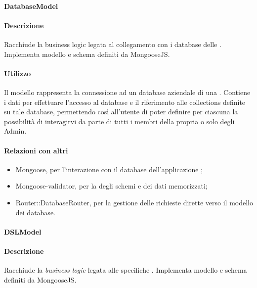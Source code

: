 \paragraph{DatabaseModel}
\paragraph*{Descrizione}

Racchiude la business logic legata al collegamento con i database delle . Implementa modello e schema definiti da MongooseJS.

\paragraph*{Utilizzo}
Il modello rappresenta la connessione ad un database aziendale di una . Contiene i dati per effettuare l'accesso al database e il riferimento alle collections definite su tale database, permettendo così all'utente di poter definire per ciascuna  la possibilità di interagirvi da parte di tutti i membri della propria  o solo degli Admin.

\paragraph*{Relazioni con altri }
\begin{itemize}
\item Mongoose, per l'interazione con il database  dell'applicazione ;
\item Mongoose-validator, per la  degli schemi e dei dati memorizzati;
\item Router::DatabaseRouter, per la gestione delle richieste dirette verso il modello dei database.
\end{itemize}

\paragraph{DSLModel}
\paragraph*{Descrizione}

Racchiude la \textit{business logic} legata alle specifiche . Implementa modello e schema definiti da MongooseJS.

